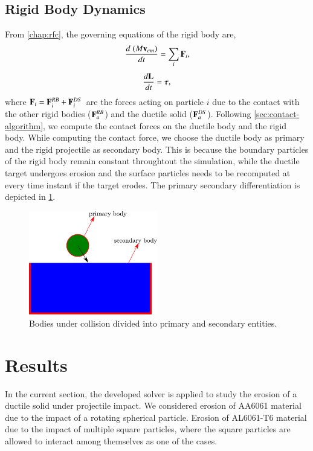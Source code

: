 \subsection{Rigid Body Dynamics}
\label{chap-erosion:sec:rigid-body-dynamics}
From \cref{chap:rfc}, the governing equations of the rigid body are,
\begin{equation}
  \label{eq:balance_linear_mom}
  \frac{d \; (M \mathbf{v}_{cm})}{d t} = \sum_i \mathbf{F}_i,
\end{equation}
\begin{equation}
  \label{eq:balance_angular_mom}
  \frac{d \mathbf{L}}{d t} = \boldsymbol{\tau},
\end{equation}
where $\mathbf{F}_i = \mathbf{F}^{RB}_i + \mathbf{F}^{DS}_i$ are the forces acting on
particle $i$ due to the contact with the other rigid bodies ($\mathbf{F}^{RB}_a$)
and the ductile solid ($\mathbf{F}^{DS}_a$). Following
\cref{sec:contact-algorithm}, we compute the contact
forces on the ductile body and the rigid body. While computing the contact
force, we choose the ductile body as primary and the rigid projectile as
secondary body. This is because the boundary particles of the rigid body remain
constant throughtout the simulation, while the ductile target undergoes erosion and
the surface particles needs to be recomputed at every time instant if the target
erodes. The primary secondary differentiation is depicted in
\cref{fig:erosion-cnt-force-divide-bodies}.
\begin{figure}[!htpb]
  \centering
  \includegraphics[width=0.5\textwidth]{images/erosion/images/contact_force/contact_force_divide}
  \caption{Bodies under collision divided into primary and secondary entities.}
\label{fig:erosion-cnt-force-divide-bodies}
\end{figure}


\FloatBarrier%
\section{Results}
\label{sec:erosion-results}
In the current section, the developed solver is applied to study the erosion of
a ductile solid under projectile impact. We considered erosion of AA6061
material due to the impact of a rotating spherical particle. Erosion of
AL6061-T6 material due to the impact of multiple square particles, where the
square particles are allowed to interact among themselves as one of the cases.


